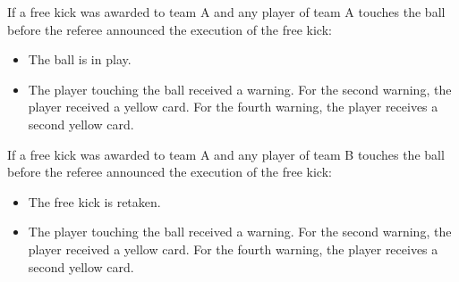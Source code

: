 If a free kick was awarded to team A and any player of team A
touches the ball before the referee announced the execution of the free kick:

\begin{itemize}
\item The ball is in play.
\item The player touching the ball received a warning. For the second warning, the player received a yellow card. For the fourth warning, the player receives a second yellow card.
\end{itemize}

\bigskip

If a free kick was awarded to team A and any player of team B
touches the ball before the referee announced the execution of the free kick:


\begin{itemize}
\item The free kick is retaken.
\item The player touching the ball received a warning. For the second warning, the player received a yellow card. For the fourth warning, the player receives a second yellow card.
\end{itemize}
